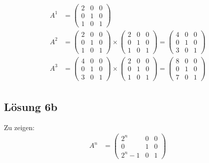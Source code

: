\documentclass[main.tex]{subfiles}
\begin{document}
\begin{equation*}
    \begin{aligned}
        A^1 & = \begin{pmatrix}
            2 & 0 & 0 \\
            0 & 1 & 0 \\
            1 & 0 & 1
        \end{pmatrix}\\
        A^2 & = \begin{pmatrix}
            2 & 0 & 0 \\
            0 & 1 & 0 \\
            1 & 0 & 1
        \end{pmatrix} \times \begin{pmatrix}
            2 & 0 & 0 \\
            0 & 1 & 0 \\
            1 & 0 & 1
        \end{pmatrix} = \begin{pmatrix}
            4 & 0 & 0 \\
            0 & 1 & 0 \\
            3 & 0 & 1
        \end{pmatrix}\\
        A^3 & = \begin{pmatrix}
            4 & 0 & 0 \\
            0 & 1 & 0 \\
            3 & 0 & 1
        \end{pmatrix} \times \begin{pmatrix}
            2 & 0 & 0 \\
            0 & 1 & 0 \\
            1 & 0 & 1
        \end{pmatrix} = \begin{pmatrix}
            8 & 0 & 0 \\
            0 & 1 & 0 \\
            7 & 0 & 1
        \end{pmatrix}\\
    \end{aligned}
\end{equation*}

\subsection{Lösung 6b}
Zu zeigen:
\begin{equation*}
    \begin{aligned}
        A^n & = \begin{pmatrix}
            2^n & 0 & 0 \\
            0 & 1 & 0 \\
            2^n -1 & 0 & 1
        \end{pmatrix}\\
    \end{aligned}
\end{equation*}
\end{document}
